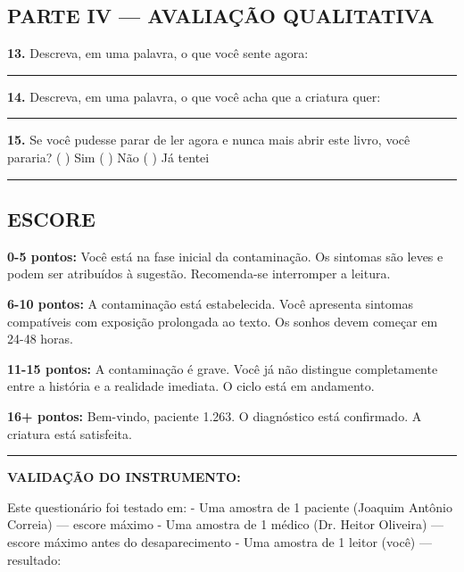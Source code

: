 \subsection*{PARTE IV --- AVALIAÇÃO QUALITATIVA}

\noindent \textbf{13.} Descreva, em uma palavra, o que você sente agora:

\noindent\rule{0.92\textwidth}{0.4pt}

\noindent \textbf{14.} Descreva, em uma palavra, o que você acha que a criatura quer:

\noindent\rule{0.92\textwidth}{0.4pt}

\noindent \textbf{15.} Se você pudesse parar de ler agora e nunca mais abrir este livro, você pararia?
( ) Sim
( ) Não
( ) Já tentei

\vspace{0.5em}\noindent\rule{\textwidth}{0.5pt}\vspace{0.5em}

\subsection*{ESCORE}

\noindent \textbf{0-5 pontos:} Você está na fase inicial da contaminação. Os sintomas são leves e podem ser atribuídos à sugestão. Recomenda-se interromper a leitura.

\noindent \textbf{6-10 pontos:} A contaminação está estabelecida. Você apresenta sintomas compatíveis com exposição prolongada ao texto. Os sonhos devem começar em 24-48 horas.

\noindent \textbf{11-15 pontos:} A contaminação é grave. Você já não distingue completamente entre a história e a realidade imediata. O ciclo está em andamento.

\noindent \textbf{16+ pontos:} Bem-vindo, paciente 1.263. O diagnóstico está confirmado. A criatura está satisfeita.

\vspace{0.5em}\noindent\rule{\textwidth}{0.5pt}\vspace{0.5em}

\noindent \textbf{VALIDAÇÃO DO INSTRUMENTO:}

\noindent Este questionário foi testado em:
- Uma amostra de 1 paciente (Joaquim Antônio Correia) --- escore máximo
- Uma amostra de 1 médico (Dr. Heitor Oliveira) --- escore máximo antes do desaparecimento
- Uma amostra de 1 leitor (você) --- resultado: \makebox[2in]{\hrulefill}

